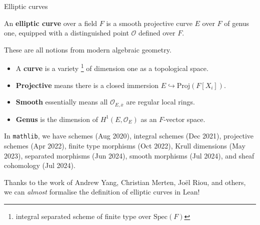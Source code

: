 \documentclass[10pt]{beamer}
\begin{document}
\begin{frame}[t]{Elliptic curves}

An \textbf{elliptic curve} over a field $ F $ is a smooth projective curve $ E $ over $ F $ of genus one, equipped with a distinguished point $ \mathcal{O} $ defined over $ F $.

\vspace{0.5cm} These are all notions from modern algebraic geometry.
\begin{itemize}
\item A \textbf{curve} is a variety \footnote{integral separated scheme of finite type over $ \mathrm{Spec}(F) $} of dimension one as a topological space.
\item \textbf{Projective} means there is a closed immersion $ E \hookrightarrow \mathrm{Proj}(F[X_i]) $.
\item \textbf{Smooth} essentially means all $ \mathcal{O}_{E, \overline{x}} $ are regular local rings.
\item \textbf{Genus} is the dimension of $ H^1(E, \mathcal{O}_E) $ as an $ F $-vector space.
\end{itemize}

\pause

\vspace{0.5cm} In \texttt{mathlib}, we have schemes (Aug 2020), integral schemes (Dec 2021), projective schemes (Apr 2022), finite type morphisms (Oct 2022), Krull dimensions (May 2023), separated morphisms (Jun 2024), smooth morphisms (Jul 2024), and sheaf cohomology (Jul 2024).

\pause

\vspace{0.5cm} Thanks to the work of Andrew Yang, Christian Merten, Jo\"el Riou, and others, we can \emph{almost} formalise the definition of elliptic curves in Lean!

\end{frame}
\end{document}
